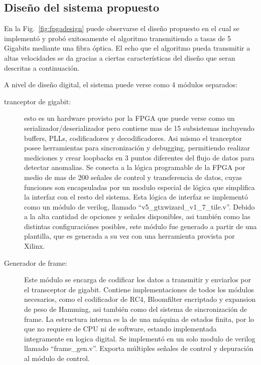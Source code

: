 \subsection{Diseño del sistema propuesto}
En la Fig.~\ref{fig:fpgadesign} puede observarse el diseño propuesto en el cual se implementó y probó exitosamente el algoritmo transmitiendo a tasas de 5 Gigabits mediante una fibra óptica.
El echo que el algoritmo pueda transmitir a altas velocidades se da gracias a ciertas características del diseño que seran descritas a continuación.

A nivel de diseño digital, el sistema puede verse como 4 módulos separados:

\begin{description}
 \item[tranceptor de gigabit:] esto es un hardware provisto por la FPGA que puede verse como un serializador/deserializador pero contiene mas de 15 subsistemas incluyendo buffers, PLLs, codificadores y decodificadores. Asi mismo el tranceptor posee herramientas para sincronización y debugging, permitiendo realizar mediciones y crear loopbacks en 3 puntos diferentes del flujo de datos para detectar anomalias. Se conecta a la lógica programable de la FPGA por medio de mas de 200 señales de control y transferencia de datos, cuyas funciones son encapsuladas por un modulo especial de lógica que simplifica la interfaz con el resto del sistema. Esta lógica de interfaz se implementó como un módulo de verilog, llamado ``v5\_gtxwizard\_v1\_7\_tile.v''. Debido a la alta cantidad de opciones y señales disponibles, asi también como las distintas configuraciónes posibles, este módulo fue generado a partir de una plantilla, que es generada a su vez con una herramienta provista por Xilinx.

 \item[Generador de frame:] Este módulo se encarga de codificar los datos a transmitir y enviarlos por el transceptor de gigabit. Contiene implementaciones de todos los módulos necesarios, como el codificador de RC4, Bloomfilter encriptado y expansion de peso de Hamming, asi también como del sistema de sincronización de frame. La estructura interna es la de una máquina de estados finita, por lo que no requiere de CPU ni de software, estando implementada integramente en logica digital. Se implementó en un solo modulo de verilog llamado ``frame\_gen.v''. Exporta múltiples señales de control y depuración al módulo de control.
 

\end{description}
